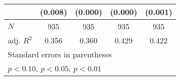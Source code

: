 {\begin{tabular}{l*{4}{c}}
            &     (0.008)         &     (0.000)         &     (0.000)         &     (0.001)         \\
\hline
\(N\)       &         935         &         935         &         935         &         935         \\
adj. \(R^{2}\)&       0.356         &       0.360         &       0.429         &       0.422         \\
\hline\hline
\multicolumn{5}{l}{\footnotesize Standard errors in parentheses}\\
\multicolumn{5}{l}{\footnotesize \sym{*} \(p<0.10\), \sym{**} \(p<0.05\), \sym{***} \(p<0.01\)}\\
\end{tabular}
}
